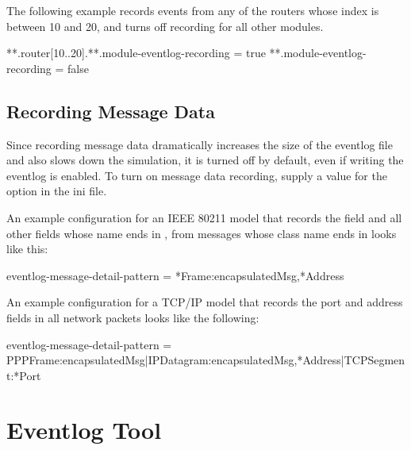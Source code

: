 The following example records events from any of the routers whose index is
between 10 and 20, and turns off recording for all other modules.

\begin{inifile}
**.router[10..20].**.module-eventlog-recording = true
**.module-eventlog-recording = false
\end{inifile}

\subsection{Recording Message Data}

Since recording message data dramatically increases the size of the
eventlog file and also slows down the simulation, it is turned off by
default, even if writing the eventlog is enabled. To turn on message data
recording, supply a value for the 
option in the ini file.



An example configuration for an IEEE 80211 model that records the  field
and all other fields whose name ends in , from messages whose class name ends in
 looks like this:

\begin{inifile}
eventlog-message-detail-pattern = *Frame:encapsulatedMsg,*Address
\end{inifile}

An example configuration for a TCP/IP model that records the port and address
fields in all network packets looks like the following:

\begin{inifile}
eventlog-message-detail-pattern =
 PPPFrame:encapsulatedMsg|IPDatagram:encapsulatedMsg,*Address|TCPSegment:*Port
\end{inifile}

%


\section{Eventlog Tool}


